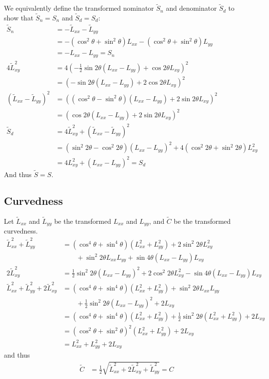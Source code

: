 \documentclass[thesis.tex]{subfiles}
\begin{document}
We equivalently define the transformed nominator $\widetilde{S}_n$ and denominator $\widetilde{S}_d$ to show that $\widetilde{S}_n = S_n$ and $\widetilde{S}_d = S_d$:
%
\begin{align*}
\widetilde{S}_n &= - \widetilde{L}_{xx} - \widetilde{L}_{yy} \\
&= -(\cos^2 \theta + \sin^2 \theta)  L_{xx} - (\cos^2 \theta + \sin^2 \theta) L_{yy} \\
&= -L_{xx} - L_{yy} = S_n \\
4\widetilde{L}_{xy}^2 &= 4(-\frac12 \sin 2\theta (L_{xx} - L_{yy}) + \cos 2\theta L_{xy})^2 \\
&= (- \sin 2\theta (L_{xx} - L_{yy}) + 2 \cos 2\theta L_{xy})^2 \\
(\widetilde{L}_{xx} - \widetilde{L}_{yy})^2 &= ((\cos^2 \theta - \sin^2 \theta) (L_{xx} - L_{yy}) + 2 \sin 2\theta L_{xy})^2 \\
&= (\cos 2\theta (L_{xx} - L_{yy}) + 2 \sin 2\theta L_{xy})^2 \\
\widetilde{S}_d &= 4\widetilde{L}_{xy}^2 + (\widetilde{L}_{xx} - \widetilde{L}_{yy})^2 \\
&= (\sin^2 2\theta - \cos^2 2\theta) (L_{xx} - L_{yy})^2 + 4 (\cos^2 2\theta + \sin^2 2\theta) L_{xy}^2 \\
&= 4 L_{xy}^2 + (L_{xx} - L_{yy})^2 = S_d
\end{align*}
%
And thus $\widetilde{S} = S$.
%
\subsection{Curvedness} \label{apx:rotation_c}
Let $\widetilde{L}_{xx}$ and $\widetilde{L}_{yy}$ be the transformed $L_{xx}$ and $L_{yy}$, and $\widetilde{C}$ be the transformed curvedness.
%
\begin{align*}
\widetilde{L}_{xx}^2 + \widetilde{L}_{yy}^2
&= (\cos^4 \theta + \sin^4 \theta) (L_{xx}^2 + L_{yy}^2) + 2 \sin^2 2\theta L_{xy}^2 \\ &\qquad + \sin^2 2\theta L_{xx} L_{yy} + \sin 4\theta (L_{xx} - L_{yy}) L_{xy} \\
2 \widetilde{L}_{xy}^2 &= \frac12 \sin^2 2\theta (L_{xx} - L_{yy})^2 + 2 \cos^2 2\theta L_{xy}^2 - \sin 4\theta (L_{xx} - L_{yy}) L_{xy} \\
\widetilde{L}_{xx}^2 + \widetilde{L}_{yy}^2 + 2 \widetilde{L}_{xy}^2
&= (\cos^4 \theta + \sin^4 \theta) (L_{xx}^2 + L_{yy}^2) + \sin^2 2\theta L_{xx} L_{yy} \\ &\qquad + \frac12 \sin^2 2\theta (L_{xx} - L_{yy})^2 + 2 L_{xy} \\
&= (\cos^4 \theta + \sin^4 \theta) (L_{xx}^2 + L_{yy}^2) + \frac12 \sin^2 2\theta (L_{xx}^2 + L_{yy}^2) + 2 L_{xy} \\
&= (\cos^2 \theta + \sin^2 \theta)^2 (L_{xx}^2 + L_{yy}^2) + 2 L_{xy} \\
&= L_{xx}^2 + L_{yy}^2 + 2 L_{xy}
\end{align*}
%
and thus
%
\begin{align*}
\widetilde{C} &= \frac12 \sqrt{\widetilde{L}_{xx}^2 + 2 \widetilde{L}_{xy}^2 + \widetilde{L}_{yy}^2} = C
\end{align*}
%
\end{document}

